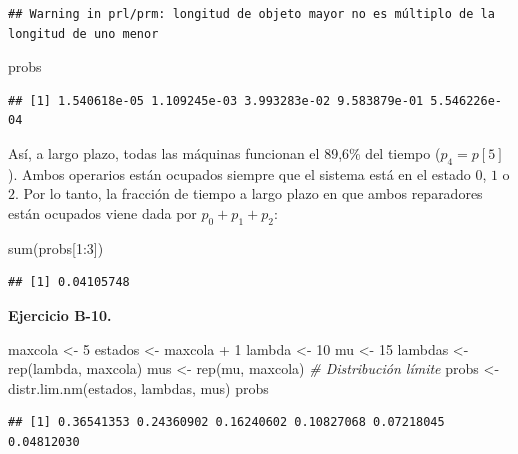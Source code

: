 \documentclass[
]{book}
\newenvironment{Shaded}{\begin{snugshade}}{\end{snugshade}}
\newcommand{\CommentTok}[1]{\textcolor[rgb]{0.56,0.35,0.01}{\textit{#1}}}
\newcommand{\DecValTok}[1]{\textcolor[rgb]{0.00,0.00,0.81}{#1}}
\newcommand{\FunctionTok}[1]{\textcolor[rgb]{0.00,0.00,0.00}{#1}}
\newcommand{\NormalTok}[1]{#1}
\newcommand{\OtherTok}[1]{\textcolor[rgb]{0.56,0.35,0.01}{#1}}
\newcommand{\SpecialCharTok}[1]{\textcolor[rgb]{0.00,0.00,0.00}{#1}}
\theoremstyle{definition}
\theoremstyle{definition}
\theoremstyle{definition}
\theoremstyle{definition}
\theoremstyle{remark}
\begin{document}
\begin{verbatim}
## Warning in prl/prm: longitud de objeto mayor no es múltiplo de la longitud de uno menor
\end{verbatim}

\begin{Shaded}
\begin{Highlighting}[]
\NormalTok{probs}
\end{Highlighting}
\end{Shaded}

\begin{verbatim}
## [1] 1.540618e-05 1.109245e-03 3.993283e-02 9.583879e-01 5.546226e-04
\end{verbatim}

Así, a largo plazo, todas las máquinas funcionan el 89,6\% del tiempo (\(p_4 = p[5]\)). Ambos operarios están ocupados siempre que el sistema está en el estado \(0\), \(1\) o \(2\). Por lo tanto, la fracción de tiempo a largo plazo en que ambos reparadores están ocupados viene dada por \(p_0 + p_1 + p_2\):

\begin{Shaded}
\begin{Highlighting}[]
\FunctionTok{sum}\NormalTok{(probs[}\DecValTok{1}\SpecialCharTok{:}\DecValTok{3}\NormalTok{])}
\end{Highlighting}
\end{Shaded}

\begin{verbatim}
## [1] 0.04105748
\end{verbatim}

\textbf{Ejercicio B-10.}

\begin{Shaded}
\begin{Highlighting}[]
\NormalTok{maxcola }\OtherTok{\textless{}{-}} \DecValTok{5}
\NormalTok{estados }\OtherTok{\textless{}{-}}\NormalTok{ maxcola }\SpecialCharTok{+} \DecValTok{1}
\NormalTok{lambda }\OtherTok{\textless{}{-}} \DecValTok{10}
\NormalTok{mu }\OtherTok{\textless{}{-}} \DecValTok{15}
\NormalTok{lambdas }\OtherTok{\textless{}{-}} \FunctionTok{rep}\NormalTok{(lambda, maxcola)}
\NormalTok{mus }\OtherTok{\textless{}{-}} \FunctionTok{rep}\NormalTok{(mu, maxcola)}
\CommentTok{\# Distribución límite}
\NormalTok{probs }\OtherTok{\textless{}{-}} \FunctionTok{distr.lim.nm}\NormalTok{(estados, lambdas, mus)}
\NormalTok{probs}
\end{Highlighting}
\end{Shaded}

\begin{verbatim}
## [1] 0.36541353 0.24360902 0.16240602 0.10827068 0.07218045 0.04812030
\end{verbatim}
\end{document}
